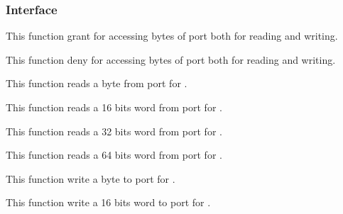 %
%

\subsubsection{Interface}

	 {
	   This function grant  for accessing
	    bytes of  port both for
	   reading and writing.
	 }

	 {
	   This function deny  for accessing
	    bytes of  port both for
	   reading and writing.
	 }

	 {
	   This function reads a byte from  port for
	   .
         }

	 {
	   This function reads a 16 bits word from  port for
	   .
         }

	 {
	   This function reads a 32 bits word from  port for
	   .
         }

	 {
	   This function reads a 64 bits word from  port for
	   .
         }

	 {
	   This function write a byte to  port for
	   .
         }

	 {
	   This function write a 16 bits word to  port for
	   .
         }

